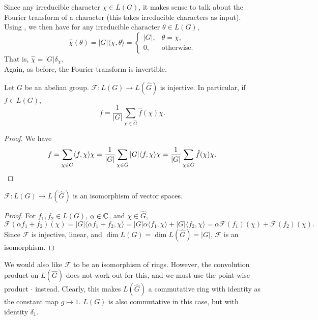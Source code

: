 		Since any irreducible character $\chi \in L(G)$, it makes sense to talk about the Fourier transform of a character (this takes irreducible characters as input). Using , we then have for any irreducible character $\theta \in L(G)$,
		\[ \hat{\chi}(\theta) = |G| \langle \chi,\theta\rangle = \begin{cases} |G|, & \theta = \chi, \\ 0, & \text{otherwise.} \end{cases} \]
		That is, $\hat{\chi} = |G| \delta_\chi$.\\

		Again, as before, the Fourier transform is invertible.

		\begin{lemma}
			\label{lem: fourier inversion}
			Let $G$ be an abelian group. $\mathcal{F} : L(G) \to L(\hat{G})$ is injective. In particular, if $f \in L(G)$,
			\[ f = \frac{1}{|G|} \sum_{\chi \in \hat{G}} \hat{f}(\chi) \chi. \]
		\end{lemma}
		\begin{proof}
			We have
			\[ f = \sum_{\chi \in \hat{G}} \langle f,\chi\rangle \chi = \frac{1}{|G|} \sum_{\chi \in \hat{G}} |G| \langle f,\chi\rangle \chi = \frac{1}{|G|} \sum_{\chi \in \hat{G}} \hat{f}(\chi) \chi. \qedhere \]
		\end{proof}

		\begin{fprop}
			\label{prop: fourier iso of vspaces}
			$\mathcal{F} : L(G) \to L(\hat{G})$ is an isomorphism of vector spaces.
		\end{fprop}
		\begin{proof}
			For $f_1,f_2 \in L(G)$, $\alpha \in \mathbb{C}$, and $\chi \in \hat{G}$,
			\[ \mathcal{F}(\alpha f_1 + f_2)(\chi) = |G|\langle \alpha f_1 + f_2 , \chi\rangle = |G| \alpha \langle f_1,\chi\rangle + |G|\langle f_2,\chi\rangle = \alpha \mathcal{F}(f_1)(\chi) + \mathcal{F}(f_2)(\chi). \]
			Since $\mathcal{F}$ is injective, linear, and $\dim L(G) = \dim L(\hat{G}) = |G|$, $\mathcal{F}$ is an isomorphism.
		\end{proof}

		We would also like $\mathcal{F}$ to be an isomorphism of rings. However, the convolution product on $L(\hat{G})$ does not work out for this, and we must use the point-wise product $\cdot$ instead. Clearly, this makes $L(\hat{G})$ a commutative ring with identity as the constant map $g \mapsto 1$. $L(G)$ is also commutative in this case, but with identity $\delta_1$.

